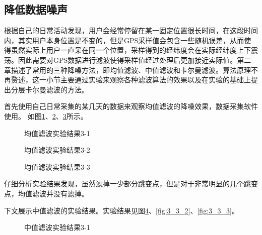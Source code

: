 \subsection{降低数据噪声}
根据自己的日常活动发现，用户会经常停留在某一固定位置很长时间，在这段时间内，其实用户本身位置是不变的，但是GPS采样值会包含一些随机误差，从而使得虽然实际上用户一直呆在同一个位置，采样得到的经纬度会在实际经纬度上下震荡。因此需要对GPS数据进行滤波使得采样值经过处理后更加接近实际值。第二章描述了常用的三种降噪方法，即均值滤波、中值滤波和卡尔曼滤波。算法原理不再赘述，这一小节主要通过实验来观察各种滤波算法的效果以及在实验的基础上提出分层卡尔曼滤波的方法。
\par 首先使用自己日常采集的某几天的数据来观察均值滤波的降噪效果，数据采集软件使用。 如图\ref{fig:3_2_1}、\ref{fig:3_2_2}、\ref{fig:3_2_3}所示。
\begin{figure}[htb]
  \centering%
  \hspace{4em}%
  \caption{均值滤波实验结果3-1}
  \label{fig:3_2_1}
\end{figure}
\begin{figure}[htb]
  \centering%
  \hspace{4em}%
  \caption{均值滤波实验结果3-2}
  \label{fig:3_2_2}
\end{figure}
\begin{figure}[htb]
  \centering%
  \hspace{4em}%
  \caption{均值滤波实验结果3-3}
  \label{fig:3_2_3}
\end{figure}
\par 仔细分析实验结果发现，虽然滤掉一少部分跳变点，但是对于非常明显的几个跳变点，均值滤波并没有滤掉。
\par 下文展示中值滤波的实验结果。实验结果见图\ref{fig:3_3_1}、\ref{fig:3_3_2}、\ref{fig:3_3_3}。
\begin{figure}[htb]
  \centering%
  \hspace{4em}%
  \caption{中值滤波实验结果3-1}
  \label{fig:3_3_1}
\end{figure}
